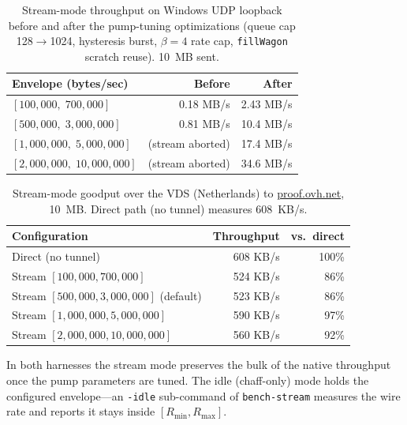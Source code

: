 \documentclass[11pt,a4paper]{article}
\begin{document}
\begin{table}[htbp]
\centering
\caption{Stream-mode throughput on Windows UDP loopback before and after the pump-tuning optimizations (queue cap 128$\to$1024, hysteresis burst, $\beta=4$ rate cap, \texttt{fillWagon} scratch reuse). 10~MB sent.}
\label{tab:bench_windows}
\begin{tabular}{@{}lrr@{}}
\toprule
\textbf{Envelope (bytes/sec)} & \textbf{Before} & \textbf{After} \\
\midrule
$[100{,}000,\; 700{,}000]$       & 0.18 MB/s & 2.43 MB/s \\
$[500{,}000,\; 3{,}000{,}000]$   & 0.81 MB/s & 10.4 MB/s \\
$[1{,}000{,}000,\; 5{,}000{,}000]$ & (stream aborted) & 17.4 MB/s \\
$[2{,}000{,}000,\; 10{,}000{,}000]$ & (stream aborted) & 34.6 MB/s \\
\bottomrule
\end{tabular}
\end{table}

\begin{table}[htbp]
\centering
\caption{Stream-mode goodput over the VDS (Netherlands) to \url{proof.ovh.net}, 10~MB. Direct path (no tunnel) measures 608~KB/s.}
\label{tab:bench_vds}
\begin{tabular}{@{}lrr@{}}
\toprule
\textbf{Configuration} & \textbf{Throughput} & \textbf{vs.\ direct} \\
\midrule
Direct (no tunnel)                                  & 608 KB/s & 100\% \\
Stream $[100{,}000, 700{,}000]$                    & 524 KB/s & 86\% \\
Stream $[500{,}000, 3{,}000{,}000]$ (default)      & 523 KB/s & 86\% \\
Stream $[1{,}000{,}000, 5{,}000{,}000]$            & 590 KB/s & 97\% \\
Stream $[2{,}000{,}000, 10{,}000{,}000]$           & 560 KB/s & 92\% \\
\bottomrule
\end{tabular}
\end{table}

In both harnesses the stream mode preserves the bulk of the native throughput once the pump parameters are tuned. The idle (chaff-only) mode holds the configured envelope---an \texttt{-idle} sub-command of \texttt{bench-stream} measures the wire rate and reports it stays inside $[R_{\min}, R_{\max}]$.
\end{document}
